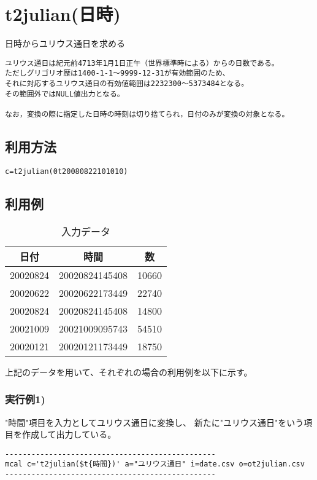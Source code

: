 
%

\section{t2julian(日時)\label{sect:t2julian}}
日時からユリウス通日を求める 
\begin{verbatim}
ユリウス通日は紀元前4713年1月1日正午（世界標準時による）からの日数である。
ただしグリゴリオ歴は1400-1-1～9999-12-31が有効範囲のため、
それに対応するユリウス通日の有効値範囲は2232300～5373484となる。
その範囲外ではNULL値出力となる。

なお，変換の際に指定した日時の時刻は切り捨てられ，日付のみが変換の対象となる。
\end{verbatim}

\subsection*{利用方法}
\begin{verbatim}
c=t2julian(0t20080822101010)
\end{verbatim}

\subsection*{利用例}

\begin{table}[hbt]
\begin{center}
 \caption{入力データ}
  \begin{tabular}{|c|c|c|} \hline
日付&時間&数\\ \hline\hline
20020824&20020824145408&10660\\ \hline
20020622&20020622173449&22740\\ \hline
20020824&20020824145408&14800\\ \hline
20021009&20021009095743&54510\\ \hline
20020121&20020121173449&18750\\ \hline
  \end{tabular}
  \end{center}
\end{table}

上記のデータを用いて、それぞれの場合の利用例を以下に示す。

\subsubsection*{実行例1)}
"時間"項目を入力としてユリウス通日に変換し、
新たに"ユリウス通日"をいう項目を作成して出力している。
\begin{verbatim}
------------------------------------------------
mcal c='t2julian($t{時間})' a="ユリウス通日" i=date.csv o=ot2julian.csv
------------------------------------------------
\end{verbatim}

